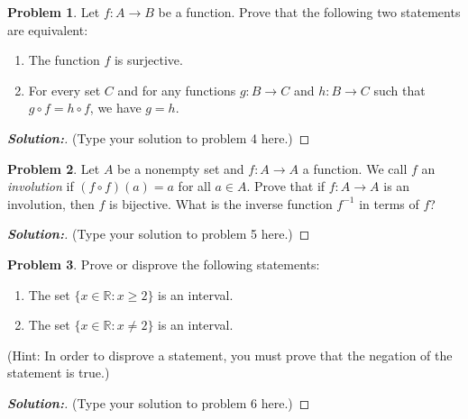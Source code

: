 \documentclass[12pt]{article}
\theoremstyle{definition}\newtheorem{problem}{Problem}
\newenvironment{solution}{\begin{proof}[\bfseries\textup{Solution:}]}{\end{proof}}
\newcommand{\R}{\mathbb{R}}
\begin{document}
\newpage
\begin{problem}
Let $f:A\to B$ be a function.  Prove that the following two statements are equivalent:
\begin{enumerate}
\item The function $f$ is surjective.
\item For every set $C$ and for any functions $g : B \to C$ and $h : B \to C$ such that $g \circ f = h \circ f$, we have $g = h$.
\end{enumerate}
\end{problem}
\begin{solution}
(Type your solution to problem 4 here.)
\end{solution}

\newpage
\begin{problem}
Let $A$ be a nonempty set and $f:A\to A$ a function.  We call $f$ an \emph{involution} if $(f\circ f)(a) = a$ for all $a\in A$.  Prove that if $f:A\to A$ is an involution, then $f$ is bijective.  What is the inverse function $f^{-1}$ in terms of $f$?
\end{problem}
\begin{solution}
(Type your solution to problem 5 here.)
\end{solution}

\newpage
\begin{problem}
Prove or disprove the following statements:
\begin{enumerate}
\item The set $\{ x\in\R : x\geq 2 \}$ is an interval.
\item The set $\{ x\in\R : x\neq 2 \}$ is an interval.
\end{enumerate}
(Hint:  In order to disprove a statement, you must prove that the negation of the statement is true.)
\end{problem}
\begin{solution}
(Type your solution to problem 6 here.)
\end{solution}
\end{document}
